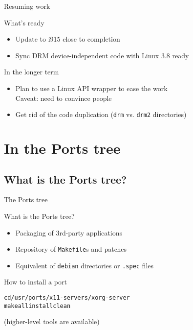 \documentclass{beamer}
\begin{document}
\begin{frame}{Resuming work}
  \begin{block}{What's ready}
    \begin{itemize}
      \item Update to i915 close to completion
      \item Sync DRM device-independent code with Linux 3.8 ready
    \end{itemize}
  \end{block}
  \begin{block}{In the longer term}
    \begin{itemize}
      \item Plan to use a Linux API wrapper to ease the work \\
        Caveat: need to convince people
      \item Get rid of the code duplication (\texttt{drm} vs. \texttt{drm2}
        directories)
    \end{itemize}
  \end{block}
\end{frame}

\section{In the Ports tree}

\subsection{What is the Ports tree?}

\begin{frame}{The Ports tree}
  \begin{block}{What is the Ports tree?}
    \begin{itemize}
      \item Packaging of 3rd-party applications
      \item Repository of \texttt{Makefile}s and patches
      \item Equivalent of \texttt{debian} directories or \texttt{.spec} files
    \end{itemize}
  \end{block}
  \pause
  \begin{block}{How to install a port}
    \begin{alltt}
      cd /usr/ports/x11-servers/xorg-server \\
      make all install clean
    \end{alltt}
  \end{block}
  (higher-level tools are available)
\end{frame}
\end{document}
